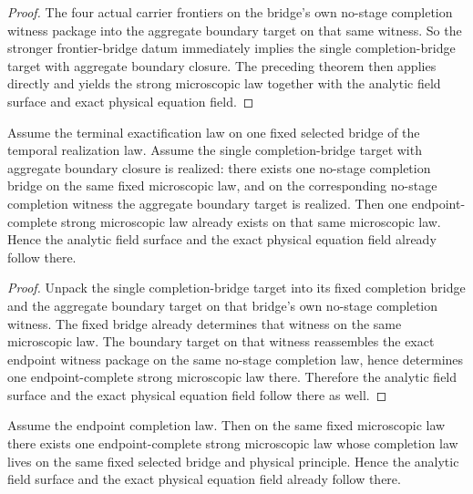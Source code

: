 \begin{proof}
The four actual carrier frontiers on the bridge's own no-stage completion
witness package into the aggregate boundary target on that same witness. So
the stronger frontier-bridge datum immediately implies the single
completion-bridge target with aggregate boundary closure. The preceding theorem
then applies directly and yields the strong microscopic law together with the
analytic field surface and exact physical equation field.
\end{proof}

\begin{theorem}
\label{thm:law-native-flagship-completion-bridge-target-recovers-the-strong-microscopic-package}
Assume the terminal exactification law on one fixed selected bridge of the
temporal realization law. Assume the single completion-bridge target with
aggregate boundary closure is realized: there exists one no-stage completion
bridge on the same fixed microscopic law, and on the corresponding no-stage
completion witness the aggregate boundary target is realized. Then one
endpoint-complete strong microscopic law already exists on that same
microscopic law. Hence the analytic field surface and the exact physical
equation field already follow there.
\end{theorem}

\begin{proof}
Unpack the single completion-bridge target into its fixed completion bridge and
the aggregate boundary target on that bridge's own no-stage completion
witness. The fixed bridge already determines that witness on the same
microscopic law. The boundary target on that
witness reassembles the exact endpoint witness package on the same no-stage
completion law, hence determines one endpoint-complete strong microscopic law
there. Therefore the analytic field surface and the exact physical equation
field follow there as well.
\end{proof}

\begin{theorem}
\label{thm:endpoint-completion-law-recovers-the-strong-microscopic-package}
Assume the endpoint completion law. Then on the same fixed microscopic law
there exists one endpoint-complete strong microscopic law whose completion law
lives on the same fixed selected bridge and physical principle. Hence the
analytic field surface and the exact physical equation field already follow
there.
\end{theorem}

